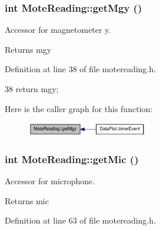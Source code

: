 \hypertarget{classMoteReading_a4344f67449dbd79febac0c4795b185f4}{
\subsubsection[{getMgy}]{\setlength{\rightskip}{0pt plus 5cm}int MoteReading::getMgy ()}}
\label{classMoteReading_a4344f67449dbd79febac0c4795b185f4}


Accessor for magnetometer y. 

\begin{DoxyReturn}{Returns}
mgy 
\end{DoxyReturn}


Definition at line 38 of file motereading.h.




\begin{DoxyCode}
38 { return mgy; }
\end{DoxyCode}




Here is the caller graph for this function:\nopagebreak
\begin{figure}[H]
\begin{center}
\leavevmode
\includegraphics[width=149pt]{classMoteReading_a4344f67449dbd79febac0c4795b185f4_icgraph}
\end{center}
\end{figure}


\hypertarget{classMoteReading_a348cb45f4613499385a354fe6857ef5d}{
\subsubsection[{getMic}]{\setlength{\rightskip}{0pt plus 5cm}int MoteReading::getMic ()}}
\label{classMoteReading_a348cb45f4613499385a354fe6857ef5d}


Accessor for microphone. 

\begin{DoxyReturn}{Returns}
mic 
\end{DoxyReturn}


Definition at line 63 of file motereading.h.




